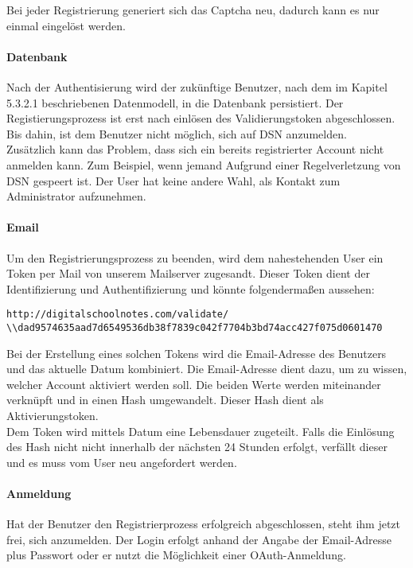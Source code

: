 Bei jeder Registrierung generiert sich das Captcha neu, dadurch kann es nur einmal eingelöst werden.\\


\paragraph{Datenbank}
Nach der Authentisierung wird der zukünftige Benutzer, nach dem im Kapitel 5.3.2.1 beschriebenen Datenmodell, in die Datenbank persistiert. Der Registierungsprozess ist erst nach einlösen des Validierungstoken abgeschlossen. Bis dahin, ist dem Benutzer nicht möglich, sich auf DSN anzumelden. \\

Zusätzlich kann das Problem, dass sich ein bereits registrierter Account nicht anmelden kann. Zum Beispiel, wenn jemand Aufgrund einer Regelverletzung von DSN gespeert ist. Der User hat keine andere Wahl, als Kontakt zum Administrator aufzunehmen.

\paragraph{Email}
Um den Registrierungsprozess zu beenden, wird dem nahestehenden User ein Token per Mail von unserem Mailserver zugesandt. Dieser Token dient der Identifizierung und Authentifizierung und könnte folgendermaßen aussehen:
\begin{lstlisting}[caption={Validierungstoken für die Aktivierung des DSN-Accounts}]
http://digitalschoolnotes.com/validate/
\\dad9574635aad7d6549536db38f7839c042f7704b3bd74acc427f075d0601470
\end{lstlisting}

Bei der Erstellung eines solchen Tokens wird die Email-Adresse des Benutzers und das aktuelle Datum kombiniert. Die Email-Adresse dient dazu, um zu wissen, welcher Account aktiviert werden soll. Die beiden Werte werden miteinander verknüpft und in einen Hash umgewandelt. Dieser Hash dient als Aktivierungstoken.\\

Dem Token wird mittels Datum eine Lebensdauer zugeteilt. Falls die Einlösung des Hash nicht nicht innerhalb der nächsten 24 Stunden erfolgt, verfällt dieser und es muss vom User neu angefordert werden. 

\paragraph{Anmeldung}
Hat der Benutzer den Registrierprozess erfolgreich abgeschlossen, steht ihm jetzt frei, sich anzumelden. Der Login erfolgt anhand der Angabe der Email-Adresse plus Passwort oder er nutzt die Möglichkeit einer OAuth-Anmeldung.\\

